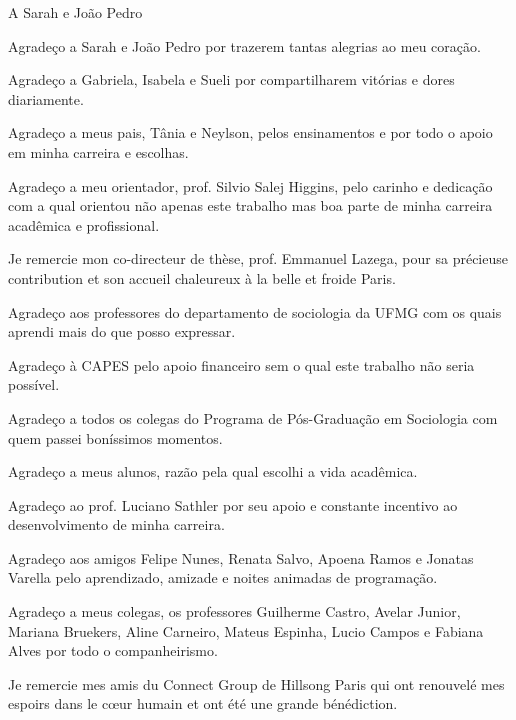 \documentclass[a4paper, 12pt, openright, oneside, german, french, english, brazil]{abntex2}
\begin{document}
	\pretextual
	\imprimircapa
	\imprimirfolhaderosto

		\begin{dedicatoria}
			\vspace*{\fill}
			A Sarah e João Pedro
			\vspace*{\fill}
		\end{dedicatoria}

	\begin{agradecimentos}
          Agradeço a Sarah e João Pedro por trazerem tantas alegrias ao meu coração.

          Agradeço a Gabriela, Isabela e Sueli por compartilharem vitórias e dores diariamente.

          Agradeço a meus pais, Tânia e Neylson, pelos ensinamentos e por todo o apoio em minha carreira e escolhas.

          Agradeço a meu orientador, prof. Silvio Salej Higgins, pelo carinho e dedicação com a qual orientou não apenas este trabalho mas boa parte de minha carreira acadêmica e profissional.

          Je remercie mon co-directeur de thèse, prof. Emmanuel Lazega, pour sa précieuse contribution et son accueil chaleureux à la belle et froide Paris.

          Agradeço aos professores do departamento de sociologia da UFMG com os quais aprendi mais do que posso expressar.

          Agradeço à CAPES pelo apoio financeiro sem o qual este trabalho não seria possível.

          Agradeço a todos os colegas do Programa de Pós-Graduação em Sociologia com quem passei boníssimos momentos.

          Agradeço a meus alunos, razão pela qual escolhi a vida acadêmica.

          Agradeço ao prof. Luciano Sathler por seu apoio e constante incentivo ao desenvolvimento de minha carreira.

          Agradeço aos amigos Felipe Nunes, Renata Salvo, Apoena Ramos e Jonatas Varella pelo aprendizado, amizade e noites animadas de programação.
          
          Agradeço a meus colegas, os professores Guilherme Castro, Avelar Junior, Mariana Bruekers, Aline Carneiro, Mateus Espinha, Lucio Campos e Fabiana Alves por todo o companheirismo.

          Je remercie mes amis du Connect Group de Hillsong Paris qui ont renouvelé mes espoirs dans le cœur humain et ont été une grande bénédiction.


\end{agradecimentos}
\end{document}
